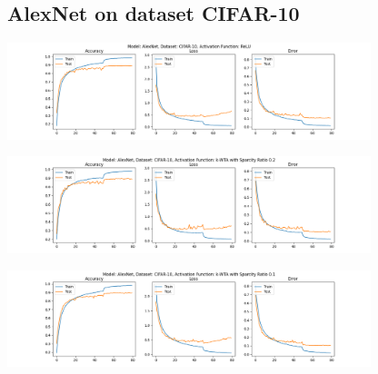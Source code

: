 \documentclass[a4paper]{article}
\begin{document}
		\subsection{AlexNet on dataset CIFAR-10}
			\begin{center}
				\centering
				\includegraphics[width=400px,keepaspectratio]{AlexNet_CIFAR-10_ReLU.png}
			\end{center}
			\begin{center}
				\centering
				\includegraphics[width=400px,keepaspectratio]{AlexNet_CIFAR-10_k-WTA_0.2.png}
			\end{center}
			\begin{center}
				\centering
				\includegraphics[width=400px,keepaspectratio]{AlexNet_CIFAR-10_k-WTA_0.1.png}
			\end{center}
		
\end{document}
